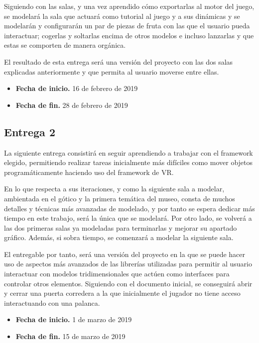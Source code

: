 Siguiendo con las salas, y una vez aprendido cómo exportarlas al motor del juego, se modelará la sala que actuará como tutorial al juego y a sus dinámicas y se modelarán y configurarán un par de piezas de fruta con las que el usuario pueda interactuar; cogerlas y soltarlas encima de otros modelos e incluso lanzarlas y que estas se comporten de manera orgánica.

El resultado de esta entrega será una versión del proyecto con las dos salas explicadas anteriormente y que permita al usuario moverse entre ellas.

\begin{itemize}
    \item \textbf{Fecha de inicio.} 16 de febrero de 2019
    \item \textbf{Fecha de fin.} 28 de febrero de 2019
\end{itemize}

\subsection{Entrega 2}

La siguiente entrega consistirá en seguir aprendiendo a trabajar con el framework elegido, permitiendo realizar tareas inicialmente más difíciles como mover objetos programáticamente haciendo uso del framework de \acs{VR}.

En lo que respecta a sus iteraciones, y como la siguiente sala a modelar, ambientada en el gótico y la primera temática del museo, consta de muchos detalles y técnicas más avanzadas de modelado, y por tanto se espera dedicar más tiempo en este trabajo, será la única que se modelará. Por otro lado, se volverá a las dos primeras salas ya modeladas para terminarlas y mejorar su apartado gráfico. Además, si sobra tiempo, se comenzará a modelar la siguiente sala.

El entregable por tanto, será una versión del proyecto en la que se puede hacer uso de aspectos más avanzados de las librerías utilizadas para permitir al usuario interactuar con modelos tridimensionales que actúen como interfaces para controlar otros elementos. Siguiendo con el documento inicial, se conseguirá abrir y cerrar una puerta corredera a la que inicialmente el jugador no tiene acceso interactuando con una palanca.

\begin{itemize}
    \item \textbf{Fecha de inicio.} 1 de marzo de 2019
    \item \textbf{Fecha de fin.} 15 de marzo de 2019
\end{itemize}

